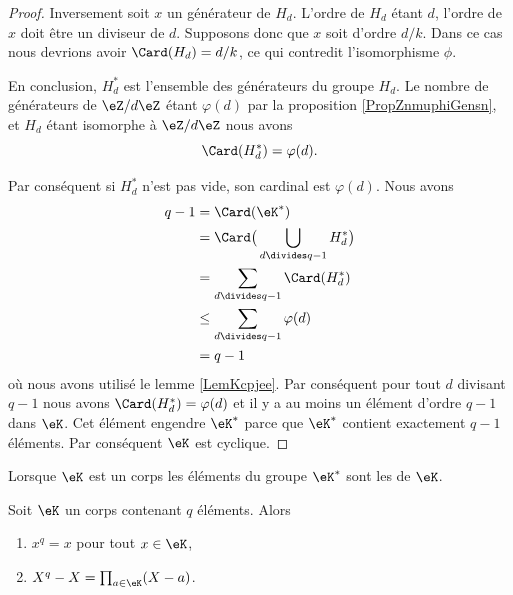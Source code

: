 \begin{proof}
    Inversement soit \( x\) un générateur de \( H_d\). L'ordre de \( H_d\) étant \( d\), l'ordre de \( x\) doit être un diviseur de \( d\). Supposons donc que \( x\) soit d'ordre \( d/k\). Dans ce cas nous devrions avoir \( \Card(H_d)=d/k\), ce qui contredit l'isomorphisme \( \phi\).

    En conclusion, \( H^*_d\) est l'ensemble des générateurs du groupe \( H_d\). Le nombre de générateurs de \( \eZ/d\eZ\) étant \( \varphi(d)\) par la proposition \ref{PropZnmuphiGensn}, et \( H_d\) étant isomorphe à \( \eZ/d\eZ\) nous avons
    \begin{equation}
        \Card(H^*_d)=\varphi(d).
    \end{equation}
    
    Par conséquent si \( H^*_d\) n'est pas vide, son cardinal est \( \varphi(d)\). Nous avons 
    \begin{subequations}
        \begin{align}
            q-1&=\Card(\eK^*)\\
            &=\Card\big( \bigcup_{d\divides q-1}H^*_d \big)\\
            &=\sum_{d\divides q-1}\Card(H^*_d)\\
            &\leq \sum_{d\divides q-1}\varphi(d)\\
            &=q-1
        \end{align}
    \end{subequations}
    où nous avons utilisé le lemme \ref{LemKcpjee}. Par conséquent pour tout \( d\) divisant \( q-1\) nous avons \( \Card(H^*_d)=\varphi(d)\) et il y a au moins un élément d'ordre \( q-1\) dans \( \eK\). Cet élément engendre \( \eK^*\) parce que \( \eK^*\) contient exactement \( q-1\) éléments. Par conséquent \( \eK\) est cyclique.
\end{proof}

Lorsque \( \eK\) est un corps les éléments du groupe \( \eK^*\) sont les  de \( \eK\).

\begin{proposition}     \label{propQRcUlq}
    Soit \( \eK\) un corps contenant \( q\) éléments. Alors
    \begin{enumerate}
        \item
            \( x^q=x\) pour tout \( x\in \eK\),
        \item
            \( X^q-X=\prod_{a\in \eK}(X-a)\).
    \end{enumerate}
\end{proposition}

